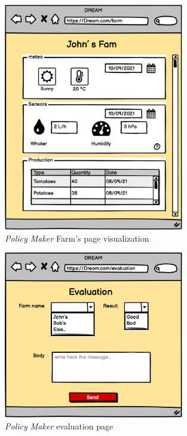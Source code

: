 \begin{figure}[H]
    \begin{center}
    \includegraphics[width=0.7\textwidth]{mockups/PMFarm.png}
    \caption{\emph{Policy Maker} Farm's page visualization}
    \label{fig:PMFarmPage}
    \end{center}
\end{figure}

\begin{figure}[H]
    \begin{center}
    \includegraphics[width=0.7\textwidth]{mockups/Evaluation.png}
    \caption{\emph{Policy Maker} evaluation page}
    \label{fig:PMevaluation}
    \end{center}
\end{figure}

